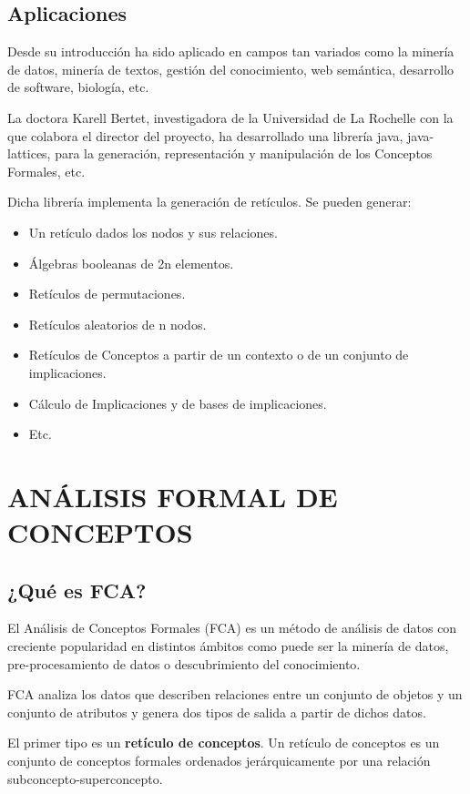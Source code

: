 \documentclass[12pt]{article}
\begin{document}
 	\subsection{Aplicaciones}
 	
 		Desde su introducción ha sido aplicado en campos tan variados como la minería de datos, minería de textos, gestión del conocimiento, web semántica, desarrollo de software, biología, etc.
 		
 		La doctora Karell Bertet, investigadora de la Universidad de La Rochelle con la que colabora el director del proyecto,  ha desarrollado una librería java, java-lattices, para la generación, representación y manipulación de los Conceptos Formales, etc. 
 		
 		Dicha librería implementa la generación de retículos. Se pueden generar:
 		\begin{itemize}
 			\item Un retículo dados los nodos y sus relaciones.
 			\item Álgebras booleanas de 2n elementos.
 			\item Retículos de permutaciones.
 			\item Retículos aleatorios de n nodos.
 			\item Retículos de Conceptos a partir de un contexto o de un conjunto de implicaciones.
 			\item Cálculo de Implicaciones y de bases de implicaciones.
 			\item Etc.
 		\end{itemize}
 		
\section{ANÁLISIS FORMAL DE CONCEPTOS}

	\subsection{¿Qué es FCA?}
	
	El Análisis de Conceptos Formales (FCA) es un método de análisis de datos con creciente popularidad en distintos ámbitos como puede ser la minería de datos, pre-procesamiento de datos o descubrimiento del conocimiento.
	
	FCA analiza los datos que describen  relaciones entre un conjunto de objetos y un conjunto de atributos y genera dos tipos de salida a partir de dichos datos. 
	
	El primer tipo es un \textbf{retículo de conceptos}. Un retículo de conceptos es un conjunto de conceptos formales ordenados jerárquicamente por una relación subconcepto-superconcepto.
	
\end{document}

